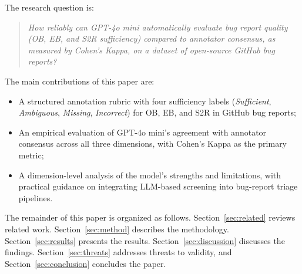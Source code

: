 The research question is:

\begin{quote}
\textit{How reliably can GPT-4o mini automatically evaluate bug report
quality (OB, EB, and S2R sufficiency) compared to annotator consensus,
as measured by Cohen's Kappa, on a dataset of open-source GitHub bug
reports?}
\end{quote}

The main contributions of this paper are:

\begin{itemize}
  \item A structured annotation rubric with four sufficiency labels
        (\textit{Sufficient}, \textit{Ambiguous}, \textit{Missing},
        \textit{Incorrect}) for OB, EB, and S2R in GitHub bug reports;
  \item An empirical evaluation of GPT-4o mini's agreement with
        annotator consensus across all three dimensions, with Cohen's
        Kappa as the primary metric;
  \item A dimension-level analysis of the model's strengths and
        limitations, with practical guidance on integrating LLM-based
        screening into bug-report triage pipelines.
\end{itemize}

The remainder of this paper is organized as follows.
Section~\ref{sec:related} reviews related work.
Section~\ref{sec:method} describes the methodology.
Section~\ref{sec:results} presents the results.
Section~\ref{sec:discussion} discusses the findings.
Section~\ref{sec:threats} addresses threats to validity, and
Section~\ref{sec:conclusion} concludes the paper.

